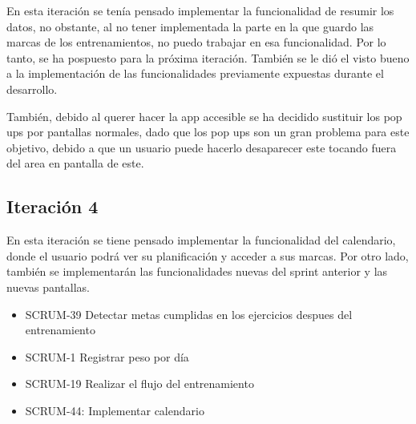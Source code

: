 En esta iteración se tenía pensado implementar la funcionalidad de resumir los datos, no obstante, al no tener implementada la parte en la que guardo las marcas de los entrenamientos, no puedo trabajar en esa funcionalidad. Por lo tanto, se ha pospuesto para la próxima iteración. También se le dió el visto bueno a la implementación de las funcionalidades previamente expuestas durante el desarrollo.

También, debido al querer hacer la app accesible se ha decidido sustituir los pop ups por pantallas normales, dado que los pop ups son un gran problema para este objetivo, debido a que un usuario puede hacerlo desaparecer este tocando fuera del area en pantalla de este. %

\subsection{Iteraci\'on 4}

En esta iteración se tiene pensado implementar la funcionalidad del calendario, donde el usuario podrá ver su planificación y acceder a sus marcas. Por otro lado, también se implementarán las funcionalidades nuevas del sprint anterior y las nuevas pantallas.

\begin{itemize}
	  \item SCRUM-39 Detectar metas cumplidas en los ejercicios despues del entrenamiento
	  \item SCRUM-1 Registrar peso por día
	  \item SCRUM-19 Realizar el flujo del entrenamiento
	  \item SCRUM-44: Implementar calendario
\end{itemize}

